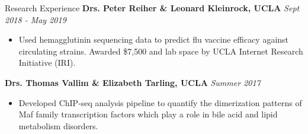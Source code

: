 \documentclass{resume} %
\begin{document}
\begin{rSection}{Research Experience}
{\bf Drs. Peter Reiher \& Leonard Kleinrock, UCLA} \hfill {\em Sept 2018 - May 2019}
\begin{itemize}
    \item Used hemagglutinin sequencing data to predict flu vaccine efficacy against circulating strains. Awarded \$7,500 and lab space by UCLA Internet Research Initiative (IRI).
\end{itemize}


{\bf Drs. Thomas Vallim \& Elizabeth Tarling, UCLA} \hfill {\em Summer 2017}
\begin{itemize}
  \item Developed ChIP-seq analysis pipeline to quantify the dimerization patterns of Maf family transcription factors which play a role in bile acid and lipid metabolism disorders.
\end{itemize}

\end{rSection}
\end{document}
